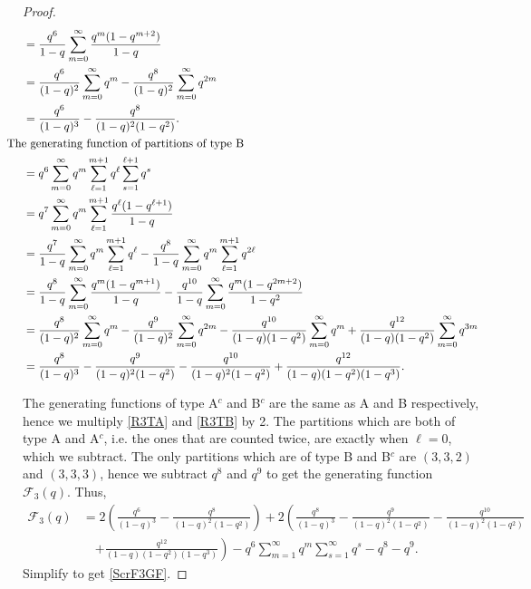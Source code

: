 \documentclass[12pt,reqno]{amsart}
\numberwithin{equation}{section}
\theoremstyle{plain}
\begin{document}
\begin{proof}
\begin{align}
			&= \frac{q^6}{1-q} \sum_{m=0}^{\infty} \frac{q^m(1-q^{m+2})}{1-q} \notag \\
			&=  \frac{q^6}{(1-q)^2} \sum_{m=0}^{\infty} q^m -  \frac{q^8}{(1-q)^2} \sum_{m=0}^{\infty} q^{2m} \notag \\
			&= \frac{q^6}{(1-q)^3} - \frac{q^8}{(1-q)^2(1-q^2)}. \label{R3TA}\\ \notag
			&\hspace{-0.5 cm}\textup{The generating function of partitions of type B} \notag \\
			&= q^6 \sum_{m=0}^{\infty} q^m \sum_{\ell=1}^{m+1} q^\ell \sum_{s=1}^{\ell+1} q^s  \notag \\
			&= q^7 \sum_{m=0}^{\infty} q^m \sum_{\ell=1}^{m+1} \frac{q^\ell(1-q^{\ell+1})}{1-q}  \notag \\
			&= \frac{q^7}{1-q} \sum_{m=0}^{\infty} q^m \sum_{\ell=1}^{m+1}q^{\ell} -  \frac{q^8}{1-q} \sum_{m=0}^{\infty} q^m \sum_{\ell=1}^{m+1}q^{2\ell}  \notag \\
			&= \frac{q^8}{1-q} \sum_{m=0}^{\infty} \frac{q^m(1-q^{m+1})}{1-q} - \frac{q^{10}}{1-q} \sum_{m=0}^{\infty} \frac{q^m(1-q^{2m+2})}{1-q^2}  \notag \\
			&=  \frac{q^8}{(1-q)^2} \sum_{m=0}^{\infty} q^m - \frac{q^9}{(1-q)^2} \sum_{m=0}^{\infty} q^{2m}   - \frac{q^{10}}{(1-q)(1-q^2)} \sum_{m=0}^{\infty} q^m + \frac{q^{12}}{(1-q)(1-q^2)} \sum_{m=0}^{\infty} q^{3m}  \notag \\
			&= \frac{q^8}{(1-q)^3} - \frac{q^9}{(1-q)^2(1-q^2)} - \frac{q^{10}}{(1-q)^2(1-q^2)} +\frac{q^{12}}{(1-q)(1-q^2)(1-q^3)}.\label{R3TB}
		\end{align}

	The generating functions of type A$^c$ and B$^c$ are the same as A and B respectively, hence we multiply \eqref{R3TA} and \eqref{R3TB} by 2. The partitions which are both of type A and A$^c$, i.e. the ones that are counted twice, are exactly when $\ell=0$, which we subtract. The only partitions which are of type B and B$^c$ are $(3,3,2)$ and $(3,3,3)$, hence we subtract $q^8$ and $q^9$ to get the generating function $\mathscr{F}_3(q)$. Thus,
	\begin{align*}
		\mathscr{F}_3(q) &= 2 \left( \frac{q^6}{(1-q)^3} - \frac{q^8}{(1-q)^2(1-q^2)} \right) + 2 \left( \frac{q^8}{(1-q)^3} - \frac{q^9}{(1-q)^2(1-q^2)} - \frac{q^{10}}{(1-q)^2(1-q^2)} \right. \\
		& \quad \left. +\frac{q^{12}}{(1-q)(1-q^2)(1-q^3)} \right) - q^6 \sum_{m=1}^{\infty} q^{m}\sum_{s=1}^{\infty} q^{s} -q^8 -q^9.
	\end{align*} 
	Simplify to get \eqref{ScrF3GF}.
	\end{proof}
\end{document}
